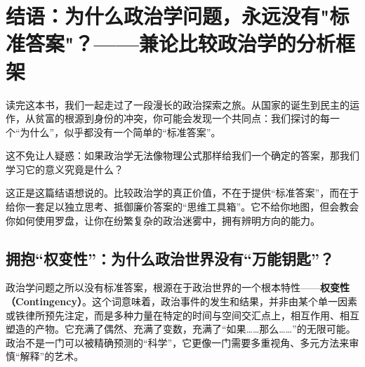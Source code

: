 \chapter{结语：为什么政治学问题，永远没有"标准答案"？——兼论比较政治学的分析框架}

读完这本书，我们一起走过了一段漫长的政治探索之旅。从国家的诞生到民主的运作，从贫富的根源到身份的冲突，你可能会发现一个共同点：我们探讨的每一个“为什么”，似乎都没有一个简单的“标准答案”。

这不免让人疑惑：如果政治学无法像物理公式那样给我们一个确定的答案，那我们学习它的意义究竟是什么？

这正是这篇结语想说的。比较政治学的真正价值，不在于提供“标准答案”，而在于给你一套足以独立思考、抵御廉价答案的“思维工具箱”。它不给你地图，但会教会你如何使用罗盘，让你在纷繁复杂的政治迷雾中，拥有辨明方向的能力。

\section{拥抱“权变性”：为什么政治世界没有“万能钥匙”？}

政治学问题之所以没有标准答案，根源在于政治世界的一个根本特性——\textbf{权变性（Contingency）}。这个词意味着，政治事件的发生和结果，并非由某个单一因素或铁律所预先注定，而是多种力量在特定的时间与空间交汇点上，相互作用、相互塑造的产物。它充满了偶然、充满了变数，充满了“如果……那么……”的无限可能。政治不是一门可以被精确预测的“科学”，它更像一门需要多重视角、多元方法来审慎“解释”的艺术。

